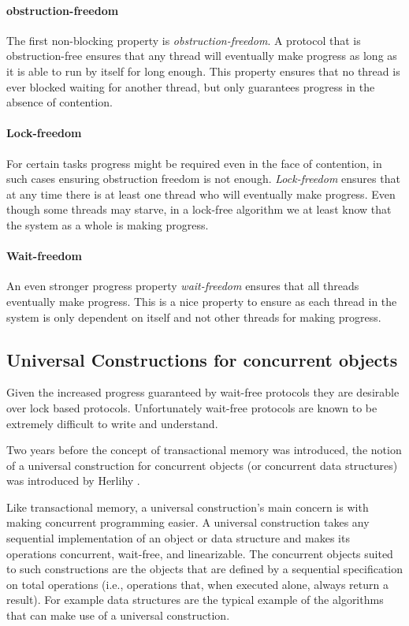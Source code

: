 \paragraph{obstruction-freedom}
The first non-blocking property is \emph{obstruction-freedom}.
A protocol that is obstruction-free ensures that any thread will eventually make progress
as long as it is able to run by itself for long enough.
This property ensures that no thread is ever blocked waiting for another thread, but only guarantees
progress in the absence of contention.

\paragraph{Lock-freedom}
For certain tasks progress might be required even in the face of contention, in such cases ensuring
obstruction freedom is not enough.
\emph{Lock-freedom} ensures that at any time there is at least one thread who will eventually make progress.
Even though some threads may starve, in a lock-free algorithm we at least know that the
system as a whole is making progress.

\paragraph{Wait-freedom}
An even stronger progress property \emph{wait-freedom} ensures that
all threads eventually make progress.
This is a nice property to ensure as each thread in the system
is only dependent on itself and not other threads for making progress.






\subsection{Universal Constructions for concurrent objects}
\label{sec:univ-const}


Given the increased progress guaranteed by wait-free protocols
they are desirable over lock based protocols.
Unfortunately wait-free protocols are
known to be extremely difficult to write and understand.

Two years before the concept of transactional memory 
was introduced, the notion of a universal construction for concurrent objects (or 
concurrent data  structures) was introduced by Herlihy \cite{H91}.

Like transactional memory, a universal construction's main concern is
with making concurrent programming easier.
A universal construction takes any sequential implementation
of an object or data structure and makes its operations concurrent, wait-free,
and linearizable.
The concurrent objects suited to such   constructions are 
the objects that are  defined by a sequential specification
on total operations (i.e., operations that, when executed alone, 
always return a result).
For example data structures are the typical example
of the algorithms that can make use of a universal construction.

